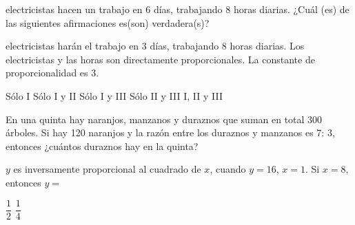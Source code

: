 \documentclass[pagina vacia]{srs}
\begin{document}
\begin{preguntas}

 electricistas hacen un trabajo en 6 días, trabajando 8 horas diarias.
¿Cuál (es) de las siguientes afirmaciones es(son) verdadera(s)?
\begin{verticali}
 electricistas harán el trabajo en 3 días, trabajando 8 horas diarias.
\alternativa Los electricistas y las horas son directamente proporcionales.
\alternativa La constante de proporcionalidad es 3.
\end{verticali}
\begin{vertical}
\alternativa Sólo I
\alternativa Sólo I y II
\alternativa Sólo I y III
\alternativa Sólo II y III
\alternativa I, II y III
\end{vertical}

\pregunta En una quinta hay naranjos, manzanos y duraznos que suman en total 300 árboles.
Si hay 120 naranjos y la razón entre los duraznos y manzanos es 7: 3, entonces
¿cuántos duraznos hay en la quinta?
\begin{vertical}
\end{vertical}

\pregunta $y$ es inversamente proporcional al cuadrado de $x$, cuando $y=16$, $x=1$.
Si $x=8$, entonces $y=$
\begin{vertical}
\alternativa $\dfrac{1}{2}$
\alternativa $\dfrac{1}{4}$
\end{vertical}


\end{preguntas}
\end{document}
